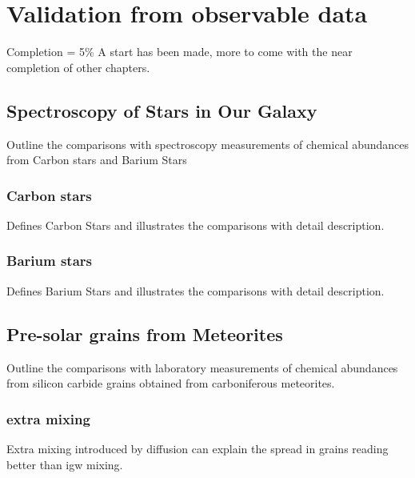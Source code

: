 \chapter{Validation from observable data}

Completion = 5\%
A start has been made, more to come with the near completion of other chapters.

\section{Spectroscopy of Stars in Our Galaxy}

Outline the comparisons with spectroscopy measurements of chemical abundances from Carbon stars and Barium Stars

\subsection{Carbon stars}

Defines Carbon Stars and illustrates the comparisons with detail description.

\subsection{Barium stars}

Defines Barium Stars and illustrates the comparisons with detail description.

\section{Pre-solar grains from Meteorites}

Outline the comparisons with laboratory measurements of chemical abundances from silicon carbide grains obtained from carboniferous meteorites.

\subsection{extra mixing}

Extra mixing introduced by diffusion can explain the spread in grains reading better than \acrfull{igw} mixing.
